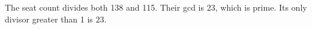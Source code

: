 The seat count divides both 138 and 115. Their gcd is 23, which is prime. Its only divisor greater than 1 is $\boxed{23}$.
